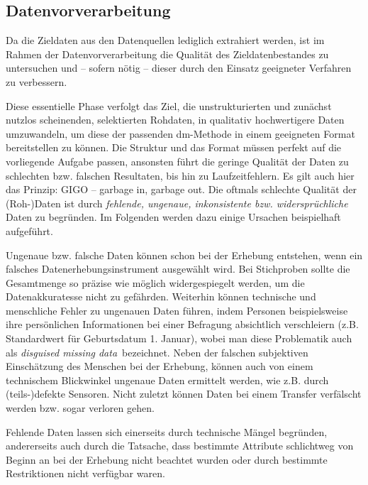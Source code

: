 \subsection{Datenvorverarbeitung}
\label{aufbereitung}
\glqq Da die Zieldaten aus den Datenquellen lediglich extrahiert werden, ist im Rahmen der Datenvorverarbeitung die Qualität des Zieldatenbestandes zu untersuchen und – sofern nötig – dieser durch den Einsatz geeigneter Verfahren zu verbessern.\grqq{}

Diese essentielle Phase verfolgt das Ziel, die unstrukturierten und zunächst nutzlos scheinenden, selektierten Rohdaten, in qualitativ hochwertigere Daten umzuwandeln, um diese der passenden \gls{dm}-Methode in einem geeigneten Format bereitstellen zu können. Die Struktur und das Format müssen perfekt auf die vorliegende Aufgabe passen, ansonsten führt die geringe Qualität der Daten zu schlechten bzw. falschen Resultaten, bis hin zu Laufzeitfehlern. Es gilt auch hier das Prinzip: GIGO – garbage in, garbage out. Die oftmals schlechte Qualität der (Roh-)Daten ist durch \textit{fehlende, ungenaue, inkonsistente bzw. widersprüchliche} Daten zu begründen. Im Folgenden werden dazu einige Ursachen beispielhaft aufgeführt.

Ungenaue bzw. falsche Daten können schon bei der Erhebung entstehen, wenn ein falsches Datenerhebungsinstrument ausgewählt wird. Bei Stichproben sollte die Gesamtmenge so präzise wie möglich widergespiegelt werden, um die Datenakkuratesse nicht zu gefährden. Weiterhin können technische und menschliche Fehler zu ungenauen Daten führen, indem Personen beispielsweise ihre persönlichen Informationen bei einer Befragung absichtlich verschleiern (z.B. Standardwert für Geburtsdatum 1. Januar), wobei man diese Problematik auch als \textit{\glqq disguised missing data\grqq}~bezeichnet. Neben der falschen subjektiven Einschätzung des Menschen bei der Erhebung, können auch von einem technischem Blickwinkel ungenaue Daten ermittelt werden, wie z.B. durch (teils-)defekte Sensoren.\enlargethispage{\baselineskip}  Nicht zuletzt können Daten bei einem Transfer verfälscht werden bzw. sogar verloren gehen.

Fehlende Daten lassen sich einerseits durch technische Mängel begründen, andererseits auch durch die Tatsache, dass bestimmte Attribute schlichtweg von Beginn an bei der Erhebung nicht beachtet wurden oder durch bestimmte Restriktionen nicht verfügbar waren.

